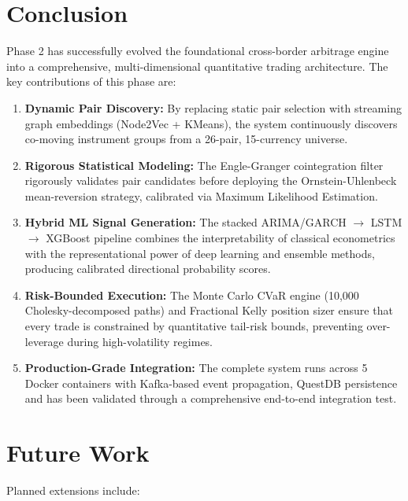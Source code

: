 \documentclass[letterpaper,11pt]{report}
\begin{document}
\section{Conclusion}

Phase 2 has successfully evolved the foundational cross-border arbitrage engine into a comprehensive, multi-dimensional quantitative trading architecture. The key contributions of this phase are:

\begin{enumerate}
    \item \textbf{Dynamic Pair Discovery:} By replacing static pair selection with streaming graph embeddings (Node2Vec + KMeans), the system continuously discovers co-moving instrument groups from a 26-pair, 15-currency universe.

    \item \textbf{Rigorous Statistical Modeling:} The Engle-Granger cointegration filter rigorously validates pair candidates before deploying the Ornstein-Uhlenbeck mean-reversion strategy, calibrated via Maximum Likelihood Estimation.

    \item \textbf{Hybrid ML Signal Generation:} The stacked ARIMA/GARCH $\to$ LSTM $\to$ XGBoost pipeline combines the interpretability of classical econometrics with the representational power of deep learning and ensemble methods, producing calibrated directional probability scores.

    \item \textbf{Risk-Bounded Execution:} The Monte Carlo CVaR engine (10,000 Cholesky-decomposed paths) and Fractional Kelly position sizer ensure that every trade is constrained by quantitative tail-risk bounds, preventing over-leverage during high-volatility regimes.

    \item \textbf{Production-Grade Integration:} The complete system runs across 5 Docker containers with Kafka-based event propagation, QuestDB persistence and has been validated through a comprehensive end-to-end integration test.
\end{enumerate}

\section{Future Work}

Planned extensions include:
\end{document}
